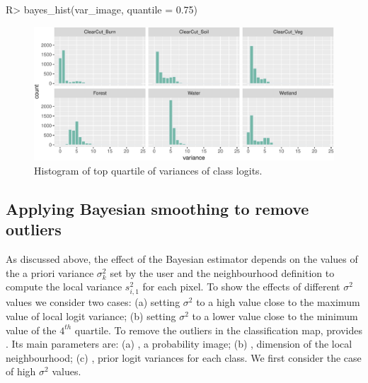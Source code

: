 \documentclass[
  shortnames]{jss}
\begin{document}
\begin{CodeChunk}
\begin{CodeInput}
R> bayes_hist(var_image, quantile = 0.75)
\end{CodeInput}
\begin{figure}[h]

{\centering \includegraphics{Bayesian_smoothing_JSS_files/figure-latex/vhist-1} 

}

\caption[Histogram of top quartile of variances of class logits]{Histogram of top quartile of variances of class logits.}\label{fig:vhist}
\end{figure}
\end{CodeChunk}

\hypertarget{applying-bayesian-smoothing-to-remove-outliers}{%
\subsection{Applying Bayesian smoothing to remove outliers}\label{applying-bayesian-smoothing-to-remove-outliers}}

As discussed above, the effect of the Bayesian estimator depends on the values of the a priori variance \(\sigma^2_{k}\) set by the user and the neighbourhood definition to compute the local variance \(s^2_{i,1}\) for each pixel. To show the effects of different \(\sigma^2\) values we consider two cases: (a) setting \(\sigma^2\) to a high value close to the maximum value of local logit variance; (b) setting \(\sigma^2\) to a lower value close to the minimum value of the \(4^{th}\) quartile. To remove the outliers in the classification map,  provides . Its main parameters are: (a) , a probability image; (b) , dimension of the local neighbourhood; (c) , prior logit variances for each class. We first consider the case of high \(\sigma^2\) values.
\end{document}
